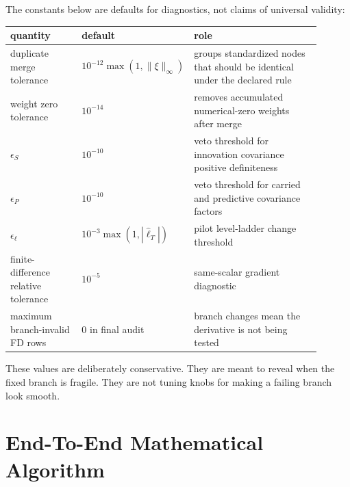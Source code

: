 \documentclass[11pt]{article}
\numberwithin{equation}{section}
\newcommand{\ellhat}{\widehat\ell}
\begin{document}
The constants below are defaults for diagnostics, not claims of universal
validity:
\begin{center}
\small
\begin{tabular}{p{0.24\linewidth}p{0.22\linewidth}p{0.44\linewidth}}
\toprule
quantity & default & role \\
\midrule
duplicate merge tolerance & \(10^{-12}\max(1,\|\xi\|_\infty)\) & groups standardized nodes that should be identical under the declared rule \\
weight zero tolerance & \(10^{-14}\) & removes accumulated numerical-zero weights after merge \\
\(\epsilon_S\) & \(10^{-10}\) & veto threshold for innovation covariance positive definiteness \\
\(\epsilon_P\) & \(10^{-10}\) & veto threshold for carried and predictive covariance factors \\
\(\epsilon_\ell\) & \(10^{-3}\max(1,|\ellhat_T|)\) & pilot level-ladder change threshold \\
finite-difference relative tolerance & \(10^{-5}\) & same-scalar gradient diagnostic \\
maximum branch-invalid FD rows & 0 in final audit & branch changes mean the derivative is not being tested \\
\bottomrule
\end{tabular}
\end{center}
These values are deliberately conservative.  They are meant to reveal when the
fixed branch is fragile.  They are not tuning knobs for making a failing
branch look smooth.

\section{End-To-End Mathematical Algorithm}
\label{sec:p32-end-to-end-algorithm}
\end{document}
